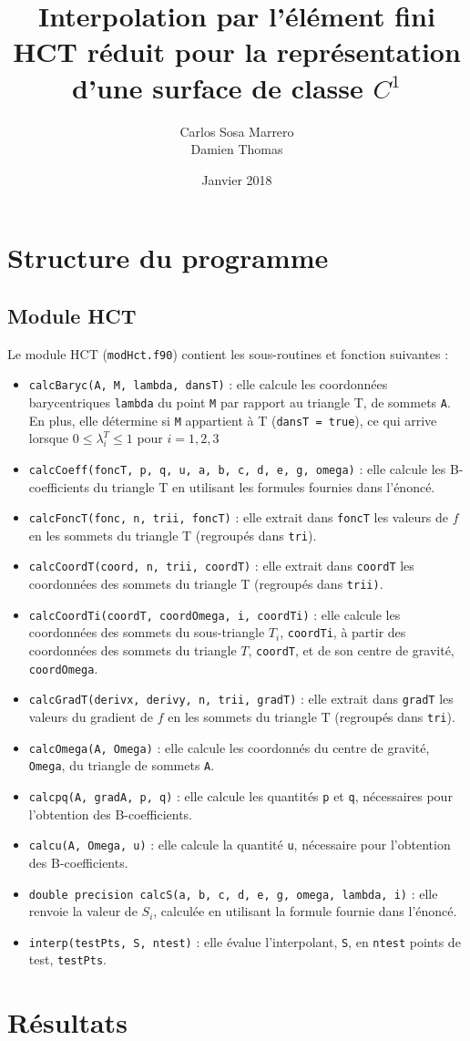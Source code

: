 \documentclass[12 pt]{article}
\title{Interpolation par l'élément fini HCT réduit
    pour la représentation d'une surface de classe $C^1$}
\date{Janvier 2018}
\author{Carlos Sosa Marrero\\
  Damien Thomas}
\begin{document}
\maketitle
\newpage
{}
\section{Structure du programme}
\subsection{Module HCT}
Le module HCT (\texttt{modHct.f90}) contient les sous-routines et fonction suivantes :
\begin{itemize}
	\item \texttt{calcBaryc(A, M, lambda, dansT)} : elle calcule les coordonnées barycentriques \texttt{lambda} du point \texttt{M} par rapport au triangle T, de sommets \texttt{A}. En plus, elle détermine si \texttt{M} appartient à T (\texttt{dansT = true}), ce qui arrive lorsque $ 0 \leq \lambda_i^T \leq 1$ pour $i = 1, 2, 3$ 
	\item \texttt{calcCoeff(foncT, p, q, u, a, b, c, d, e, g, omega)} : elle calcule les B-coefficients du triangle T en utilisant les formules fournies dans l'énoncé.
	\item \texttt{calcFoncT(fonc, n, trii, foncT)} : elle extrait dans \texttt{foncT} les valeurs de $f$ en les sommets du triangle T (regroupés dans \texttt{tri}).
	\item \texttt{calcCoordT(coord, n, trii, coordT)} : elle extrait dans \texttt{coordT} les coordonnées des sommets du triangle T (regroupés dans \texttt{trii)}.
	\item \texttt{calcCoordTi(coordT, coordOmega, i, coordTi)} : elle calcule les coordonnées des sommets du sous-triangle $T_i$, \texttt{coordTi}, à partir des coordonnées des sommets du triangle $T$, \texttt{coordT}, et de son centre de gravité, \texttt{coordOmega}.
	\item \texttt{calcGradT(derivx, derivy, n, trii, gradT)} : elle extrait dans \texttt{gradT} les valeurs du gradient de $f$ en les sommets du triangle T (regroupés dans \texttt{tri}).
	\item \texttt{calcOmega(A, Omega)} : elle calcule les coordonnés du centre de gravité, \texttt{Omega}, du triangle de sommets \texttt{A}.
	\item \texttt{calcpq(A, gradA, p, q)} : elle calcule les quantités \texttt{p} et \texttt{q}, nécessaires pour l'obtention des B-coefficients.
	\item \texttt{calcu(A, Omega, u)} : elle calcule la quantité \texttt{u}, nécessaire pour l'obtention des B-coefficients.
	\item \texttt{double precision calcS(a, b, c, d, e, g, omega, lambda, i)} : elle renvoie la valeur de $S_i$, calculée en utilisant la formule fournie dans l'énoncé.
	\item \texttt{interp(testPts, S, ntest)} : elle évalue l'interpolant, \texttt{S}, en \texttt{ntest} points de test, \texttt{testPts}.
	
	
\end{itemize}
\section{Résultats}
\end{document}
